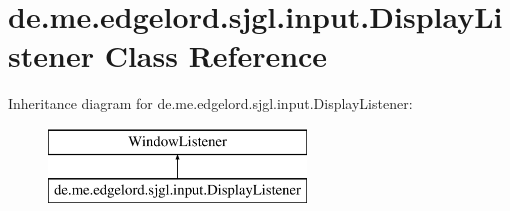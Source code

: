 \hypertarget{classde_1_1me_1_1edgelord_1_1sjgl_1_1input_1_1_display_listener}{}\section{de.\+me.\+edgelord.\+sjgl.\+input.\+Display\+Listener Class Reference}
\label{classde_1_1me_1_1edgelord_1_1sjgl_1_1input_1_1_display_listener}
Inheritance diagram for de.\+me.\+edgelord.\+sjgl.\+input.\+Display\+Listener\+:\begin{figure}[H]
\begin{center}
\leavevmode
\includegraphics[height=2.000000cm]{classde_1_1me_1_1edgelord_1_1sjgl_1_1input_1_1_display_listener}
\end{center}
\end{figure}
